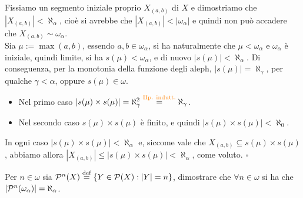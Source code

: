 	Fissiamo un segmento iniziale proprio $X_{(a,b)}$ di $X$ e dimostriamo che $|X_{(a,b)}| < \aleph_\alpha$, cio\`e si avrebbe che $|X_{(a,b)}| < |\omega_\alpha|$ e quindi non pu\`o accadere che $X_{(a,b)} \sim \omega_\alpha$.\\
	Sia $\mu := \max(a,b)$, essendo $a,b \in \omega_\alpha$, si ha naturalmente che $\mu < \omega_\alpha$ e $\omega_\alpha$ \`e iniziale, quindi limite, si ha $s(\mu) < \omega_{\alpha}$, e di nuovo $|s(\mu)| < \aleph_\alpha$. Di conseguenza, per la monotonia della funzione degli aleph, $|s(\mu)| = \aleph_\gamma$, per qualche $\gamma < \alpha$, oppure $s(\mu) \in \omega$.
	\begin{itemize}
		\item Nel primo caso $|s(\mu) \times s(\mu)| = \aleph_\gamma^2 \overset{\text{\textcolor{orange}{Hp. indutt.}}}{=} \aleph_\gamma$.
		\item Nel secondo caso $s(\mu) \times s(\mu)$ \`e finito, e quindi $|s(\mu) \times s(\mu)| < \aleph_0$.
	\end{itemize}
	In ogni caso $|s(\mu) \times s(\mu)| < \aleph_\alpha$ e, siccome vale che $X_{(a,b)} \subseteq s(\mu) \times s(\mu)$, abbiamo allora $|X_{(a,b)}| \leq |s(\mu) \times s(\mu)| < \aleph_\alpha$, come voluto. \hfill $\square$

\begin{exercise}
	Per $n \in \omega$ sia $\mathcal{P}^n(X) \overset{\text{def}}{=} \{Y \in \mathcal{P}(X) : |Y| = n\}$, dimostrare che $\forall n \in \omega$ si ha che $|\mathcal{P}^n(\omega_\alpha)| = \aleph_\alpha$.
\end{exercise}

